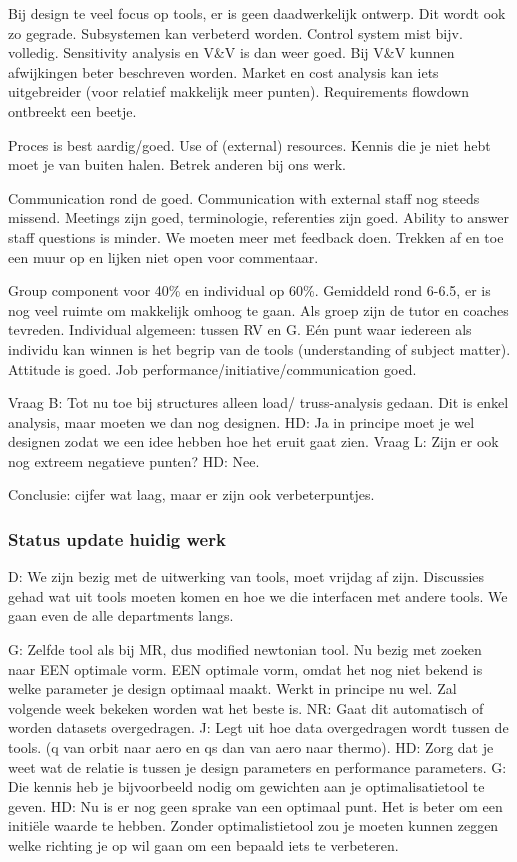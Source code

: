 Bij design te veel focus op tools, er is geen daadwerkelijk ontwerp. Dit wordt ook zo gegrade. 
Subsystemen kan verbeterd worden. Control system mist bijv. volledig. Sensitivity analysis en V\&V is dan weer goed. Bij V\&V kunnen afwijkingen beter beschreven worden.
Market en cost analysis kan iets uitgebreider (voor relatief makkelijk meer punten).
Requirements flowdown ontbreekt een beetje.

Proces is best aardig/goed. Use of (external) resources. Kennis die je niet hebt moet je van buiten halen. Betrek anderen bij ons werk.

Communication rond de goed. Communication with external staff nog steeds missend. Meetings zijn goed, terminologie, referenties zijn goed. Ability to answer staff questions is minder. We moeten meer met feedback doen. Trekken af en toe een muur op en lijken niet open voor commentaar.

Group component voor 40\% en individual op 60\%. Gemiddeld rond 6-6.5, er is nog veel ruimte om makkelijk omhoog te gaan. Als groep zijn de tutor en coaches tevreden.
Individual algemeen: tussen RV en G. Eén punt waar iedereen als individu kan winnen is het begrip van de tools (understanding of subject matter). Attitude is goed. Job performance/initiative/communication goed. 

Vraag B: Tot nu toe bij structures alleen load/ truss-analysis gedaan. Dit is enkel analysis, maar moeten we dan nog designen. HD: Ja in principe moet je wel designen zodat we een idee hebben hoe het eruit gaat zien.
Vraag L: Zijn er ook nog extreem negatieve punten? HD: Nee.

Conclusie: cijfer wat laag, maar er zijn ook verbeterpuntjes.
\subsubsection{Status update huidig werk}
D: We zijn bezig met de uitwerking van tools, moet vrijdag af zijn. Discussies gehad wat uit tools moeten komen en hoe we die interfacen met andere tools. We gaan even de alle departments langs.

G: Zelfde tool als bij MR, dus modified newtonian tool. Nu bezig met zoeken naar EEN optimale vorm. EEN optimale vorm, omdat het nog niet bekend is welke parameter je design optimaal maakt. Werkt in principe nu wel. Zal volgende week bekeken worden wat het beste is.
NR: Gaat dit automatisch of worden datasets overgedragen.
J: Legt uit hoe data overgedragen wordt tussen de tools. (q van orbit naar aero en qs dan van aero naar thermo).
HD: Zorg dat je weet wat de relatie is tussen je design parameters en performance parameters.
G: Die kennis heb je bijvoorbeeld nodig om gewichten aan je optimalisatietool te geven.
HD: Nu is er nog geen sprake van een optimaal punt. Het is beter om een initiële waarde te hebben. Zonder optimalistietool zou je moeten kunnen zeggen welke richting je op wil gaan om een bepaald iets te verbeteren.


